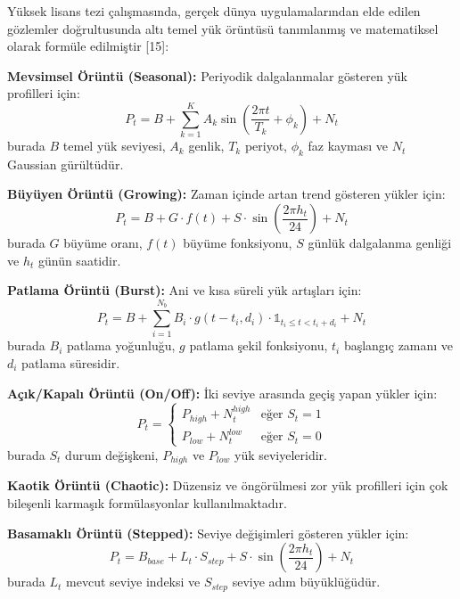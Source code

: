 \documentclass[12pt,a4paper]{article}
\begin{document}
Yüksek lisans tezi çalışmasında, gerçek dünya uygulamalarından elde edilen gözlemler doğrultusunda altı temel yük örüntüsü tanımlanmış ve matematiksel olarak formüle edilmiştir [15]:

\textbf{Mevsimsel Örüntü (Seasonal):} Periyodik dalgalanmalar gösteren yük profilleri için:
\begin{equation}
P_t = B + \sum_{k=1}^{K} A_k \sin\left(\frac{2\pi t}{T_k} + \phi_k\right) + N_t
\end{equation}
burada $B$ temel yük seviyesi, $A_k$ genlik, $T_k$ periyot, $\phi_k$ faz kayması ve $N_t$ Gaussian gürültüdür.

\textbf{Büyüyen Örüntü (Growing):} Zaman içinde artan trend gösteren yükler için:
\begin{equation}
P_t = B + G \cdot f(t) + S \cdot \sin\left(\frac{2\pi h_t}{24}\right) + N_t
\end{equation}
burada $G$ büyüme oranı, $f(t)$ büyüme fonksiyonu, $S$ günlük dalgalanma genliği ve $h_t$ günün saatidir.

\textbf{Patlama Örüntü (Burst):} Ani ve kısa süreli yük artışları için:
\begin{equation}
P_t = B + \sum_{i=1}^{N_b} B_i \cdot g(t-t_i, d_i) \cdot \mathbb{1}_{t_i \leq t < t_i+d_i} + N_t
\end{equation}
burada $B_i$ patlama yoğunluğu, $g$ patlama şekil fonksiyonu, $t_i$ başlangıç zamanı ve $d_i$ patlama süresidir.

\textbf{Açık/Kapalı Örüntü (On/Off):} İki seviye arasında geçiş yapan yükler için:
\begin{equation}
P_t = \begin{cases}
P_{high} + N_t^{high} & \text{eğer } S_t = 1 \\
P_{low} + N_t^{low} & \text{eğer } S_t = 0
\end{cases}
\end{equation}
burada $S_t$ durum değişkeni, $P_{high}$ ve $P_{low}$ yük seviyeleridir.

\textbf{Kaotik Örüntü (Chaotic):} Düzensiz ve öngörülmesi zor yük profilleri için çok bileşenli karmaşık formülasyonlar kullanılmaktadır.

\textbf{Basamaklı Örüntü (Stepped):} Seviye değişimleri gösteren yükler için:
\begin{equation}
P_t = B_{base} + L_t \cdot S_{step} + S \cdot \sin\left(\frac{2\pi h_t}{24}\right) + N_t
\end{equation}
burada $L_t$ mevcut seviye indeksi ve $S_{step}$ seviye adım büyüklüğüdür.
\end{document}
